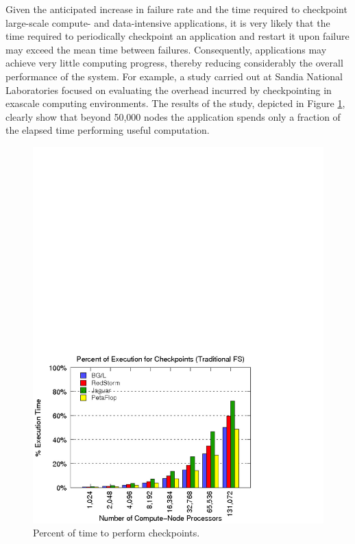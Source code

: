 Given the anticipated increase in failure rate and the time required
to checkpoint large-scale compute- and data-intensive applications, it
is very likely that the time required to periodically checkpoint an
application and restart it upon failure may exceed the mean time
between failures.  Consequently, applications may achieve very little
computing progress, thereby reducing considerably the overall
performance of the system.  For example, a study carried out at Sandia
National Laboratories focused on evaluating the overhead incurred by
checkpointing in exascale computing environments. The results of the
study, depicted in Figure \ref{sandia_checkpoint_time}, clearly show
that beyond 50,000 nodes the application spends only a fraction of the
elapsed time performing useful computation.

\begin{figure}[!t]
\centering
\includegraphics[width=\columnwidth]{figures/sandia_percent_of_time_for_checkpoints.pdf}
\caption { Percent of time to perform checkpoints. }
\label{sandia_checkpoint_time}
\end{figure}


